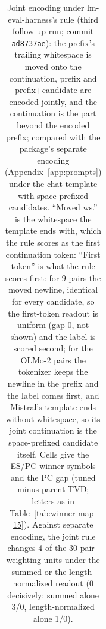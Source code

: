 \begin{table}[t]
\begin{tabular}{@{}lllcccc@{}}
\bottomrule
\end{tabular}
\caption{Joint encoding under lm-eval-harness's rule (third follow-up run; commit \texttt{ad8737ae}): the prefix's trailing whitespace is moved onto the continuation, prefix and prefix+candidate are encoded jointly, and the continuation is the part beyond the encoded prefix; compared with the package's separate encoding (Appendix~\ref{app:prompts}) under the chat template with space-prefixed candidates. ``Moved ws.'' is the whitespace the template ends with, which the rule scores as the first continuation token: ``First token'' is what the rule scores first: for 9 pairs the moved newline, identical for every candidate, so the first-token readout is uniform (gap 0, not shown) and the label is scored second; for the OLMo-2 pairs the tokenizer keeps the newline in the prefix and the label comes first, and Mistral's template ends without whitespace, so its joint continuation is the space-prefixed candidate itself. Cells give the ES/PC winner symbols and the PC gap (tuned minus parent TVD; letters as in Table~\ref{tab:winner-map-15}). Against separate encoding, the joint rule changes 4 of the 30 pair--weighting units under the summed or the length-normalized readout (0 decisively; summed alone 3/0, length-normalized alone 1/0).}
\label{tab:joint-tokenization}
\end{table}
